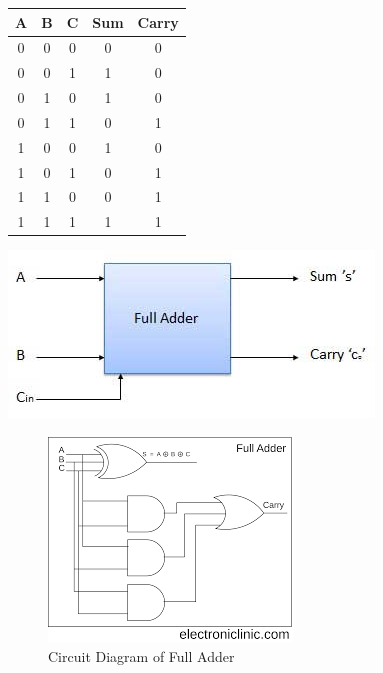 \documentclass[a4paper, 12pt]{article}
\begin{document}
\begin{minipage}[c]{0.4\textwidth}

	\begin{center}
	\begin{tabular}[h]{|c|c|c|c|c|}
	\hline
	A & B & C & Sum & Carry \\
	\hline
	0 & 0 & 0 & 0 & 0 \\
	0 & 0 & 1 & 1 & 0 \\
	0 & 1 & 0 & 1 & 0 \\
	0 & 1 & 1 & 0 & 1 \\
	1 & 0 & 0 & 1 & 0 \\
	1 & 0 & 1 & 0 & 1 \\
	1 & 1 & 0 & 0 & 1 \\
	1 & 1 & 1 & 1 & 1 \\
	\hline
	\end{tabular}
	\end{center}
\end{minipage}
\begin{minipage}[c]{0.55\textwidth}
	\centering
	\includegraphics[scale=0.5]{full-adder-block.jpg}
\end{minipage}

\begin{figure}[h]
	\centering
	\includegraphics[scale=0.6]{full-adder-circuit.png}
	\caption{Circuit Diagram of Full Adder}
\end{figure}
\end{document}
